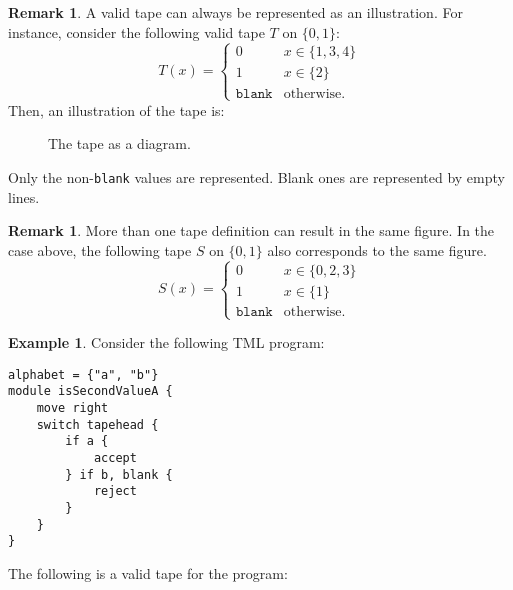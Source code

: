 \documentclass{article}
\theoremstyle{definition}
\newtheorem{remark}[rules]{Remark}
\newtheorem{example}[rules]{Example}
\theoremstyle{plain}
\begin{document}
    \begin{remark}
        A valid tape can always be represented as an illustration. For instance, consider the following valid tape $T$ on $\{0, 1\}$:
        \[T(x) = \begin{cases}
            0 & x \in \{1, 3, 4\} \\
            1 & x \in \{2\} \\
            \texttt{blank} & \text{otherwise}.
        \end{cases}\]
        Then, an illustration of the tape is:
        \begin{figure}[H]
            \centering
            \caption{The tape as a diagram.}
        \end{figure}
        \noindent Only the non-\texttt{blank} values are represented. Blank ones are represented by empty lines.
    \end{remark}
    \begin{remark}
        More than one tape definition can result in the same figure. In the case above, the following tape $S$ on $\{0, 1\}$ also corresponds to the same figure.
        \[S(x) = \begin{cases}
            0 & x \in \{0, 2, 3\} \\
            1 & x \in \{1\} \\
            \texttt{blank} & \text{otherwise}.
        \end{cases}\]        
    \end{remark}
    \begin{example}
Consider the following TML program:
\begin{lstlisting}[language=TML]
alphabet = {"a", "b"}
module isSecondValueA {
    move right
    switch tapehead {
        if a {
            accept
        } if b, blank {
            reject
        }
    }
}
\end{lstlisting}
    The following is a valid tape for the program:
    \begin{figure}[H]
        \centering
    \end{figure}
    \end{example}
\end{document}
